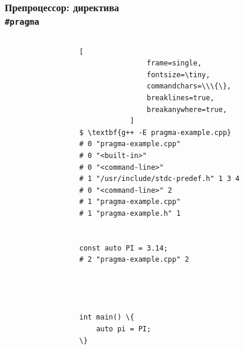 \documentclass[compress]{beamer}
\begin{document}
\begin{frame}[fragile]

    \frametitle{Препроцессор: директива \\ \texttt{\#pragma}}

    \begin{columns}[T]

        \begin{column}{0.5\textwidth}



        \end{column}

        \begin{column}{0.5\textwidth}

            \begin{Verbatim}[
                frame=single,
                fontsize=\tiny,
                commandchars=\\\{\},
                breaklines=true,
                breakanywhere=true,
            ]
$ \textbf{g++ -E pragma-example.cpp}
# 0 "pragma-example.cpp"
# 0 "<built-in>"
# 0 "<command-line>"
# 1 "/usr/include/stdc-predef.h" 1 3 4
# 0 "<command-line>" 2
# 1 "pragma-example.cpp"
# 1 "pragma-example.h" 1


const auto PI = 3.14;
# 2 "pragma-example.cpp" 2




int main() \{
    auto pi = PI;
\}
            \end{Verbatim}

        \end{column}

    \end{columns}

\end{frame}
\end{document}

